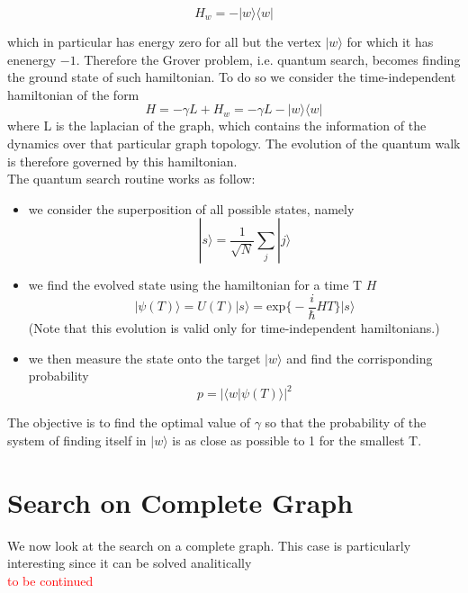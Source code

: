 \documentclass[11pt, twoside]{report}
\newcommand{\red}[1]{\textcolor{red}{#1}}
\begin{document}
\begin{equation}
  H_w = -|w\rangle\langle w|
\end{equation}

which in particular has energy zero for all but the vertex $|w\rangle$ for which it has enenergy $-1$. Therefore the Grover problem, i.e. quantum search, becomes finding the ground state of such hamiltonian. To do so we consider the time-independent hamiltonian of the form
\begin{equation}
  H = -\gamma L + H_w = -\gamma L -|w\rangle\langle w|
\end{equation}
where L is the laplacian of the graph, which contains the information of the dynamics over that particular graph topology. The evolution of the quantum walk is therefore governed by this hamiltonian.\\

The quantum search routine works as follow:
\begin{itemize}
  \item we consider the superposition of all possible states, namely
  \begin{equation}
    |s\rangle = \frac{1}{\sqrt{N}}\sum_j|j\rangle
  \end{equation}

  \item we find the evolved state using the hamiltonian for a time T $H$
  \begin{equation}
  |\psi(T)\rangle = U(T)|s\rangle  = \mbox{exp}\Big\{-\frac{i}{\hbar}HT\big\}|s\rangle
  \end{equation}
  (Note that this evolution is valid only for time-independent hamiltonians.)

  \item we then measure the state onto the target $|w\rangle$ and find the corrisponding probability
  \begin{equation}
    p = |\langle w|\psi(T)\rangle|^2
  \end{equation}

\end{itemize}

The objective is to find the optimal value of $\gamma$ so that the probability of the system of finding itself in $|w\rangle$ is as close as possible to 1 for the smallest T.

\section{Search on Complete Graph}
We now look at the search on a complete graph. This case is particularly interesting since it can be solved analitically\\
\red{to be continued}
\end{document}
